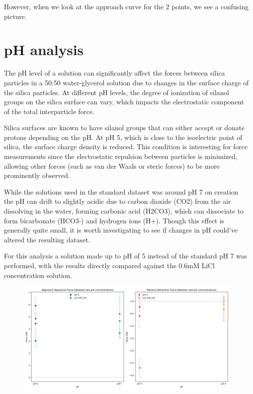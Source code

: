 However, when we look at the approach curve for the 2 points, we see a confusing picture. 

\newpage
\section{pH analysis}

The pH level of a solution can significantly affect the forces between silica particles in a 50:50 water-glycerol solution due to changes in the surface charge of the silica particles. At different pH levels, the degree of ionization of silanol groups on the silica surface can vary, which impacts the electrostatic component of the total interparticle force. 

Silica surfaces are known to have silanol groups that can either accept or donate protons depending on the pH. At pH 5, which is close to the isoelectric point of silica, the surface charge density is reduced. This condition is interesting for force measurements since the electrostatic repulsion between particles is minimized, allowing other forces (such as van der Waals or steric forces) to be more prominently observed. \cite{Pavan2019}

While the solutions used in the standard dataset was around pH 7 on creation the pH can drift to slightly acidic due to carbon dioxide (CO2) from the air dissolving in the water, forming carbonic acid (H2CO3), which can dissociate to form bicarbonate (HCO3-) and hydrogen ions (H+). Though this effect is generally quite small, it is worth investigating to see if changes in pH could've altered the resulting dataset.

For this analysis a solution made up to pH of 5 instead of the standard pH 7 was performed, with the results directly compared against the 0.6mM LiCl concentration solution. 

\begin{figure}[h!]
\centering
\includegraphics[width=\textwidth]{chapter7/pH/Overall image.png}
\caption{}
\label{fig:pHOverall}
\end{figure}

